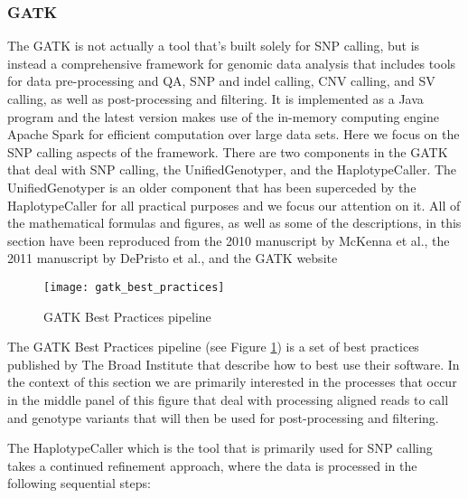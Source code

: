 \subsubsection{GATK}
The GATK\autocite{depristo2011framework} is not actually a tool that's built solely for SNP calling, but is instead a comprehensive framework for genomic data analysis that includes tools for data pre-processing and QA, SNP and indel calling, CNV calling, and SV calling, as well as post-processing and filtering. It is implemented as a Java program and the latest version makes use of the in-memory computing engine Apache Spark for efficient computation over large data sets. Here we focus on the SNP calling aspects of the framework. There are two components in the GATK that deal with SNP calling, the UnifiedGenotyper, and the HaplotypeCaller. The UnifiedGenotyper is an older component that has been superceded by the HaplotypeCaller for all practical purposes and we focus our attention on it. All of the mathematical formulas and figures, as well as some of the descriptions, in this section have been reproduced from the 2010 manuscript by McKenna et al.\autocite{mckenna2010genome}, the 2011 manuscript by DePristo et al.\autocite{depristo2011framework}, and the GATK website\autocite{gatkwebsite}

\begin{figure}[!htb]
\texttt{[image: gatk\_best\_practices]}
\centering
\caption {GATK Best Practices pipeline\autocite{gatkwebsite}}
\label{fig:gatk_best_practices}
\end{figure}

The GATK Best Practices pipeline (see Figure \ref{fig:gatk_best_practices}) is a set of best practices published by The Broad Institute that describe how to best use their software. In the context of this section we are primarily interested in the processes that occur in the middle panel of this figure that deal with processing aligned reads to call and genotype variants that will then be used for post-processing and filtering.

The HaplotypeCaller which is the tool that is primarily used for SNP calling takes a continued refinement approach, where the data is processed in the following sequential steps:

